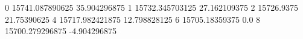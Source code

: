 0 15741.087890625 35.904296875
1 15732.345703125 27.162109375
2 15726.9375 21.75390625
4 15717.982421875 12.798828125
6 15705.18359375 0.0
8 15700.279296875 -4.904296875
